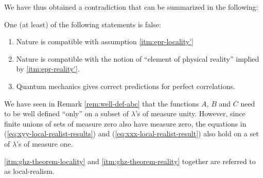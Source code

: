 We have thus obtained a contradiction that can be summarized in the following:
\begin{theorem}
  One (at least) of the following statements is false:
  \begin{enumerate}[label=(\roman*)]
  \item \label{itm:ghz-theorem-locality} Nature is compatible with assumption \ref{itm:epr-locality'}
  \item \label{itm:ghz-theorem-reality} Nature is compatible with the notion of ``element of physical reality'' implied by \ref{itm:epr-reality'}.
  \item Quantum mechanics gives correct predictions for perfect correlations.
  \end{enumerate}
\end{theorem}

\begin{remark}
  We have seen in Remark \ref{rem:well-def-abc} that the functions $A$, $B$ and $C$ need to be well defined ``only'' on a subset of $\lambda$'s of measure unity. However, since finite unions of sets of measure zero also have measure zero, the equations in (\ref{eq:xyy-local-realist-results}) and (\ref{eq:xxx-local-realist-result}) also hold on a set of $\lambda$'s of measure one.
\end{remark}


\begin{note}%
  \ref{itm:ghz-theorem-locality} and \ref{itm:ghz-theorem-reality} together are referred to as local-realism.
\end{note}
